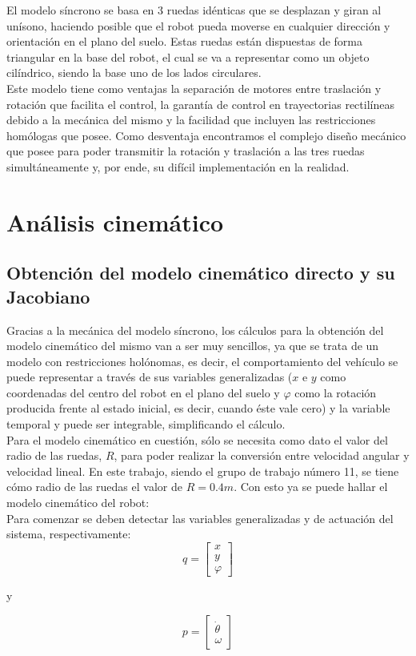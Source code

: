 \documentclass[a4paper,twoside]{article}
\begin{document}
El modelo síncrono se basa en 3 ruedas idénticas que se desplazan y giran al unísono, haciendo posible que el robot pueda moverse en cualquier dirección y orientación en el plano del suelo. Estas ruedas están dispuestas de forma triangular en la base del robot, el cual se va a representar como un objeto cilíndrico, siendo la base uno de los lados circulares.\\

Este modelo tiene como ventajas la separación de motores entre traslación y rotación que facilita el control, la garantía de control en trayectorias rectilíneas debido a la mecánica del mismo y la facilidad que incluyen las restricciones homólogas que posee. Como desventaja encontramos el complejo diseño mecánico que posee para poder transmitir la rotación y traslación a las tres ruedas simultáneamente y, por ende, su difícil implementación en la realidad.\\



\section{Análisis cinemático}
	\subsection{Obtención del modelo cinemático directo y su Jacobiano}
	Gracias a la mecánica del modelo síncrono, los cálculos para la obtención del modelo cinemático del mismo van a ser muy sencillos, ya que se trata de un modelo con restricciones holónomas, es decir, el comportamiento del vehículo se puede representar a través de sus variables generalizadas ($x$ e $y$ como coordenadas del centro del robot en el plano del suelo y $\varphi$ como la rotación producida frente al estado inicial, es decir, cuando éste vale cero) y la variable temporal y puede ser integrable, simplificando el cálculo.\\
	
	Para el modelo cinemático en cuestión, sólo se necesita como dato el valor del radio de las ruedas, $R$, para poder realizar la conversión entre velocidad angular y velocidad lineal. En este trabajo, siendo el grupo de trabajo número 11, se tiene cómo radio de las ruedas el valor de $R = 0.4 m$. Con esto ya se puede hallar el modelo cinemático del robot:\\
	
	Para comenzar se deben detectar las variables generalizadas y de actuación del sistema, respectivamente:
		$$
		q=
		\begin{bmatrix}
		x\\y\\\varphi
		\end{bmatrix}
		$$		
		{\centering y \par}
		$$
		p=
		\begin{bmatrix}
		\dot{\theta}\\\omega
		\end{bmatrix}
		$$
\end{document}
